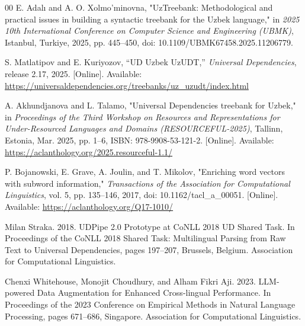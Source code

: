 \documentclass[10pt,conference,a4paper]{IEEEtran_EDM}
\begin{document}
\begin{thebibliography}{00}
E. Adalı and A. O. Xolmo'minovna, "UzTreebank: Methodological and practical issues in building a syntactic treebank for the Uzbek language," in \textit{2025 10th International Conference on Computer Science and Engineering (UBMK)}, Istanbul, Turkiye, 2025, pp. 445--450, doi: 10.1109/UBMK67458.2025.11206779.

S. Matlatipov and E. Kuriyozov, ``UD Uzbek UzUDT,'' \textit{Universal Dependencies}, release 2.17, 2025. [Online]. Available: \url{https://universaldependencies.org/treebanks/uz_uzudt/index.html}

A. Akhundjanova and L. Talamo, "Universal Dependencies treebank for Uzbek," in \textit{Proceedings of the Third Workshop on Resources and Representations for Under-Resourced Languages and Domains (RESOURCEFUL-2025)}, Tallinn, Estonia, Mar. 2025, pp. 1--6, ISBN: 978-9908-53-121-2. [Online]. Available: \url{https://aclanthology.org/2025.resourceful-1.1/}

P. Bojanowski, E. Grave, A. Joulin, and T. Mikolov, "Enriching word vectors with subword information," \textit{Transactions of the Association for Computational Linguistics}, vol. 5, pp. 135--146, 2017, doi: 10.1162/tacl\_a\_00051. [Online]. Available: \url{https://aclanthology.org/Q17-1010/}

Milan Straka. 2018. UDPipe 2.0 Prototype at CoNLL 2018 UD Shared Task. In Proceedings of the CoNLL 2018 Shared Task: Multilingual Parsing from Raw Text to Universal Dependencies, pages 197–207, Brussels, Belgium. Association for Computational Linguistics.

Chenxi Whitehouse, Monojit Choudhury, and Alham Fikri Aji. 2023. LLM-powered Data Augmentation for Enhanced Cross-lingual Performance. In Proceedings of the 2023 Conference on Empirical Methods in Natural Language Processing, pages 671–686, Singapore. Association for Computational Linguistics.

\end{thebibliography}
\end{document}
